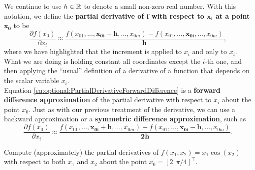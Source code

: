 We continue to use $h \in \mathbb R $ to denote a small non-zero real number. With this notation, we define the \textbf{partial derivative of $\mathbf{f}$ with respect to $\mathbf{x_i}$ at a point $\mathbf{x_0}$} to be
\begin{equation}
    \label{eq:optional:PartialDerivativeForwardDifference}
    \frac{\partial f(x_0)}{\partial x_i} \approx \frac{f(x_{01},\ldots, \mathbf{x_{0i} + h}, \ldots, x_{0m}) - f(x_{01}, \ldots,\mathbf{x_{0i}}, \ldots,  x_{0m})}{\mathbf{h}},
\end{equation}
where we have highlighted that the increment is applied to $x_i$ and only to $x_i$.
 What we are doing is holding constant all coordinates except the $i$-th one, and then applying the ``usual'' definition of a derivative of a function that depends on the scalar variable $x_i$. \\
 
 Equation \eqref{eq:optional:PartialDerivativeForwardDifference} is a \textbf{forward difference approximation} of the partial derivative with respect to $x_i$ about the point $x_0$. Just as with our previous treatment of the derivative, we can use a backward approximation or a \textbf{symmetric difference approximation}, such as
\begin{equation}
    \label{eq:optional:PartialDerivativeSymmetricDifference}
    \frac{\partial f(x_0)}{\partial x_i} \approx \frac{f(x_{01},\ldots, \mathbf{x_{0i} + h}, \ldots, x_{0m}) - f(x_{01}, \ldots,\mathbf{x_{0i}-h}, \ldots,  x_{0m})}{\mathbf{2h}}. 
\end{equation}

\vspace*{.2cm}

\begin{example} 
\label{ex:optional:PartialDerivative} 
Compute (approximately) the partial derivatives of $f(x_1, x_2) = x_1 \cos(x_2)$ with respect to both $x_1$ and $x_2$ about the point $x_0=[2~~\pi/4]^\top$.
\end{example}

